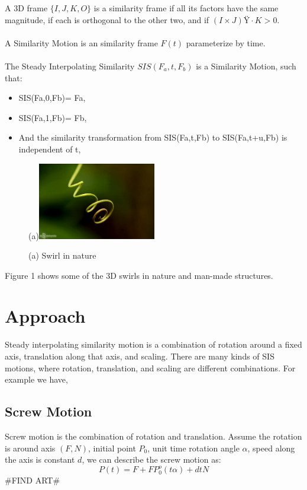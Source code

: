 \documentclass[twoside,11pt]{article}
\begin{document}
A 3D frame $\{I,J,K,O\}$ is a similarity frame if all its factors have the same magnitude, if each is orthogonal to the other two, and if $(I \times J) \cdot K>0$.\\
\\
A Similarity Motion is an similarity frame $F(t)$ parameterize by time.\\
\\
The Steady Interpolating Similarity $SIS(F_a,t,F_b)$ is a Similarity Motion, such that:
\begin{itemize}
\item SIS(Fa,0,Fb)= Fa,
\item SIS(Fa,1,Fb)= Fb,
\item And the similarity transformation from SIS(Fa,t,Fb) to SIS(Fa,t+u,Fb) is independent of t,
\end{itemize}

\begin{figure}[h]
  \centering
  (a)\includegraphics[width=0.46\textwidth]{plant}
  \caption{(a) Swirl in nature}
  \label{fig:time}
\end{figure}

Figure 1 shows some of the 3D swirls in nature and man-made structures.

\section{Approach}
Steady interpolating similarity motion is a combination of rotation around a fixed axis, translation along that axis, and scaling. There are many kinds of SIS motions, where rotation, translation, and scaling are different combinations. For example we have,

\subsection{Screw Motion}
Screw motion is the combination of rotation and translation. Assume the rotation is around axis $(F, N)$, initial point $P_0$, unit time rotation angle $\alpha$, speed along the axis is constant $d$, we can describe the screw motion as:
\begin{equation}
P(t) = F + FP_0^o(t\alpha) + dtN
\end{equation}
\#FIND ART\#
\end{document}

